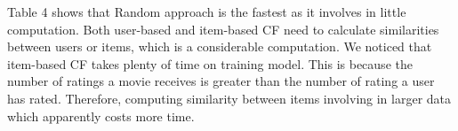 \documentclass[conference]{IEEEtran}
\begin{document}
Table 4 shows that Random approach is the fastest as it involves in little computation. Both user-based and item-based CF need to calculate similarities between users or items, which is a considerable computation. We noticed that item-based CF takes plenty of time on training model. This is because the number of ratings a movie receives is greater than the number of rating a user has rated. Therefore, computing similarity between items involving in larger data which apparently costs more time. 
%
%



%
%
\end{document}
